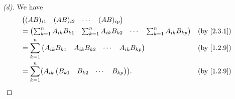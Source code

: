 \begin{proof}[(d)]
  We have
  \begin{align*}
     & \begin{pmatrix}
         (AB)_{i 1} & (AB)_{i 2} & \cdots & (AB)_{i p}
       \end{pmatrix}                                                                                            \\
     & = \begin{pmatrix}
           \sum_{k = 1}^n A_{i k} B_{k 1} & \sum_{k = 1}^n A_{i k} B_{k 2} & \cdots & \sum_{k = 1}^n A_{i k} B_{k p}
         \end{pmatrix} &  & \text{(by \cref{2.3.1})}                              \\
     & = \sum_{k = 1}^n \begin{pmatrix}
                          A_{i k} B_{k 1} & A_{i k} B_{k 2} & \cdots & A_{i k} B_{k p}
                        \end{pmatrix}                                              &  & \text{(by \cref{1.2.9})}                                \\
     & = \sum_{k = 1}^n \pa{A_{i k} \begin{pmatrix}
                                        B_{k 1} & B_{k 2} & \cdots & B_{k p}
                                      \end{pmatrix}}.                                                               &  & \text{(by \cref{1.2.9})}
  \end{align*}
\end{proof}
